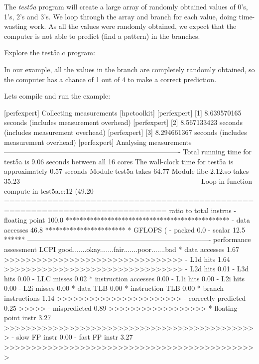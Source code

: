 The \emph{test5a} program will create a large array of randomly obtained values of 0's, 1's, 2's and 3's. We loop through the array and branch for each value, doing time-wasting work. As all the values were randomly obtained, we expect that the computer is not able to predict (find a pattern) in the branches.

Explore the test5a.c program:

\begin{prompt}
\end{prompt}

In our example, all the values in the branch are completely randomly obtained, so the computer has a chance of 1 out of 4 to make a correct prediction.

Lets compile and run the example:

\begin{prompt}
[perfexpert] Collecting measurements [hpctoolkit]
[perfexpert]    [1] 8.639570165 seconds (includes measurement overhead)
[perfexpert]    [2] 8.567133423 seconds (includes measurement overhead)
[perfexpert]    [3] 8.294661367 seconds (includes measurement overhead)
[perfexpert] Analysing measurements
----------------------------------------------------------------------------
Total running time for test5a is 9.06 seconds between all 16 cores
The wall-clock time for test5a is approximately 0.57 seconds
Module test5a takes 64.77%
Module libc-2.12.so takes 35.23%
----------------------------------------------------------------------------
Loop in function compute in test5a.c:12 (49.20%
============================================================================
ratio to total instrns    %
 - floating point      100.0 ***********************************************
 - data accesses        46.8 ***********************
* GFLOPS (%
 - packed                0.0
 - scalar               12.5 ******
-------------------------------------------------------------------------------
performance assessment  LCPI good.......okay.......fair.......poor.......bad
* data accesses         1.67 >>>>>>>>>>>>>>>>>>>>>>>>>>>>>>>>>
 - L1d hits             1.64 >>>>>>>>>>>>>>>>>>>>>>>>>>>>>>>>>
 - L2d hits             0.01
 - L3d hits             0.00
 - LLC misses           0.02
* instruction accesses  0.00
 - L1i hits             0.00
 - L2i hits             0.00
 - L2i misses           0.00
* data TLB              0.00
* instruction TLB       0.00
* branch instructions   1.14 >>>>>>>>>>>>>>>>>>>>>>>
 - correctly predicted  0.25 >>>>>
 - mispredicted         0.89 >>>>>>>>>>>>>>>>>>
* floating-point instr  3.27 >>>>>>>>>>>>>>>>>>>>>>>>>>>>>>>>>>>>>>>>>>>>>>>
 - slow FP instr        0.00
 - fast FP instr        3.27 >>>>>>>>>>>>>>>>>>>>>>>>>>>>>>>>>>>>>>>>>>>>>>>
\end{prompt}

